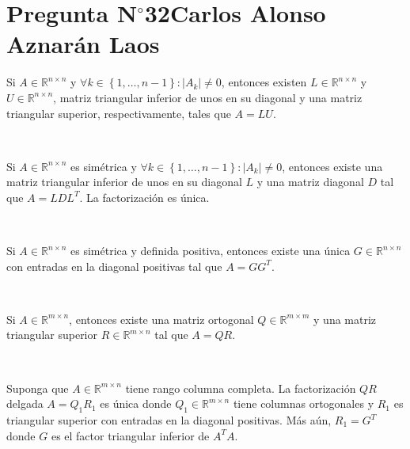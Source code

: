 \section{Pregunta N$^{\circ}$32\qquad Carlos Alonso Aznarán Laos}

\begin{frame}

	\begin{theorem}[Factorización $LU$]
		Si $A\in\mathbb{R}^{n\times n}$ y
		\begin{math}
			\forall k\in\left\{1,\dotsc,n-1\right\}:
			\left|A_{k}\right|\neq 0
		\end{math},
		entonces existen $L\in\mathbb{R}^{n\times n}$ y
		$U\in\mathbb{R}^{n\times n}$, matriz triangular inferior de unos
		en su diagonal y una matriz triangular superior, respectivamente,
		tales que $A=LU$.
	\end{theorem}

	\

	\begin{theorem}
		Si $A\in\mathbb{R}^{n\times n}$ es simétrica y
		\begin{math}
			\forall k\in\left\{1,\dotsc,n-1\right\}:
			\left|A_{k}\right|\neq 0
		\end{math},
		entonces existe una matriz triangular inferior de unos en su
		diagonal $L$ y una matriz diagonal $D$ tal que $A=LDL^{T}$.
		La factorización es única.
	\end{theorem}

	\

	\begin{theorem}
		Si $A\in\mathbb{R}^{n\times n}$ es simétrica y definida
		positiva, entonces existe una única
		$G\in\mathbb{R}^{n\times n}$ con entradas en la diagonal
		positivas tal que $A=GG^{T}$.
	\end{theorem}

	\

	\begin{theorem}[Factorización $QR$]
		Si $A\in\mathbb{R}^{m\times n}$, entonces existe una matriz
		ortogonal $Q\in\mathbb{R}^{m\times m}$ y una matriz triangular
		superior $R\in\mathbb{R}^{m\times n}$ tal que $A=QR$.
	\end{theorem}

	\

	\begin{theorem}\label{thm:tinyqr}
		Suponga que $A\in\mathbb{R}^{m\times n}$ tiene rango columna
		completa.
		La factorización $QR$ delgada $A=Q_{1}R_{1}$ es única donde
		$Q_{1}\in\mathbb{R}^{m\times n}$ tiene columnas ortogonales y
		$R_{1}$ es triangular superior con entradas en la diagonal
		positivas.
		Más aún, $R_{1}=G^{T}$ donde $G$ es el factor triangular
		inferior de $A^{T}A$.
	\end{theorem}
\end{frame}

